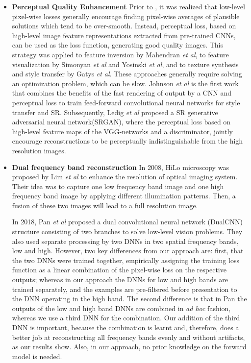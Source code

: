 \documentclass[10pt,twocolumn,letterpaper]{article}
\begin{document}
\begin{itemize}
\item \textbf{Perceptual Quality Enhancement} 
Prior to \cite{li2018spectral}, it was realized that low-level pixel-wise losses generally encourage finding pixel-wise averages of plausible solutions which tend to be over-smooth\cite{gupta2011modified,wang2004image,wang2003multiscale,bruna2015super,mathieu2015deep,dosovitskiy2016generating}. Instead, perceptual loss, based on high-level image feature representations extracted from pre-trained CNNs, can be used as the loss function, generating good quality images. This strategy was applied to feature inversion by Mahendran \textit{et al}\cite{mahendran2015understanding}, to feature visualization by Simonyan \textit{et al}\cite{simonyan2013deep} and Yosinski \textit{et al}\cite{yosinski2015understanding}, and to texture synthesis and style transfer by Gatys \textit{et al}\cite{gatys2015texture}. These approaches generally require solving an optimization problem, which can be slow. 
Johnson \textit{et al}\cite{johnson2016perceptual} is the first work that combines the benefits of the fast rendering of output by a CNN and perceptual loss to train feed-forward convolutional neural networks for style transfer and SR. Subsequently, Ledig \textit{et al}\cite{ledig2017photo} proposed a SR generative adversarial neural network\cite{goodfellow2014generative}(SRGAN), where the perceptual loss based on high-level feature maps of the VGG-networks\cite{simonyan2014very} and a discriminator, jointly encourage reconstructions to be perceptually indistinguishable from the high resolution images. 

\item \textbf{Dual frequency band reconstruction}
In 2008, HiLo microscopy \cite{lim2008wide} was proposed by Lim \textit{et al} to enhance the resolution of optical imaging system. Their idea was to capture one low frequency band image and one high frequency band image by applying different illumination patterns. Then, a fusion of these two images will lead to a full resolution image.

In 2018, Pan \textit{et al} proposed a dual convolutional neural network (DualCNN)\cite{Pan_2018_CVPR} structure consisting of two branches to solve low-level vision problems. They also used separate processing by two DNNs in two spatial frequency bands, low and high. However, two key differences from our approach are: first, that the two DNNs were trained together, empirically assigning the training loss function as a linear combination of the pixel-wise loss on the respective outputs; whereas in our approach the DNNs for low and high bands are trained separately, and the examples are pre-filtered before presentation to the DNN operating in the high band. The second difference is that in Pan the outputs of the low and high band DNNs are combined in {\em ad hoc} fashion, whereas we use a third DNN for the combination. Our addition of the third DNN is important, because the combination is learnt and, therefore, does a better job at reconstructing all frequency bands evenly and without artifacts, as our results show.  Also, in our approach, no prior knowledge on the forward model is needed.
\end{itemize}
\end{document}
